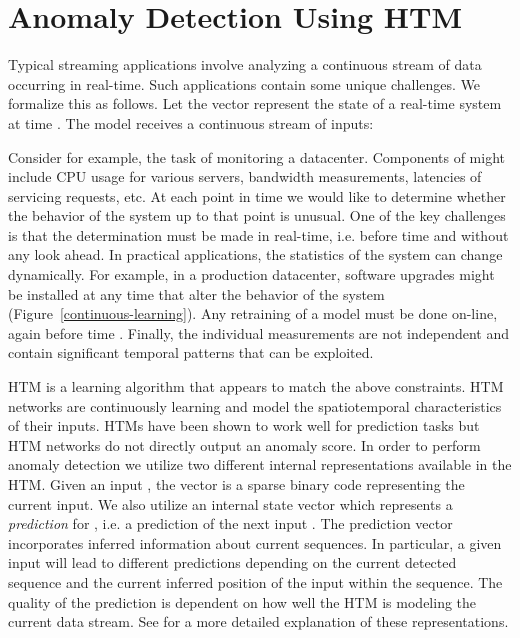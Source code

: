 \documentclass{article}
\begin{document}
\section{Anomaly Detection Using HTM}

Typical streaming applications involve analyzing a continuous stream of data
occurring in real-time. Such applications contain some unique challenges. We
formalize this as follows. Let the vector  represent the state
of a real-time system at time . The model receives a continuous stream of
inputs:



Consider for example, the task of monitoring a datacenter. Components of
 might include CPU usage for various servers, bandwidth
measurements, latencies of servicing requests, etc.  At each point in time  we would
like to determine whether the behavior of the system up to that point is
unusual.  One of the key challenges is that the determination must be made in
real-time, i.e. before time  and without any look ahead. In practical
applications, the statistics of the system can change dynamically. For example,
in a production datacenter, software upgrades might be installed at any time that
alter the behavior of the system (Figure~\ref{continuous-learning}). Any
retraining of a model must be done
on-line, again before time .  Finally, the individual measurements are
not independent and contain significant temporal patterns that can be
exploited.

HTM is a learning algorithm that appears to match the
above constraints. HTM networks are continuously learning and model the
spatiotemporal characteristics of their inputs.  HTMs have been shown to work well
for prediction tasks \cite{Cui2015, Padilla2013} but HTM networks do not directly output an
anomaly score. In order to perform anomaly detection we utilize two
different internal representations available in the HTM. Given an input
, the vector  is a sparse binary
code representing the current input. We also utilize an internal state vector
 which represents a {\em prediction} for
, i.e. a prediction of the next input
. The prediction vector incorporates inferred information
about current sequences. In particular, a given input will lead to different
predictions depending on the current detected sequence and the current inferred
position of the input within the sequence.  The quality of the prediction is
dependent on how well the HTM is modeling the current data stream. See
\cite{Hawkins2016} for a more detailed explanation of these representations.
\end{document}
